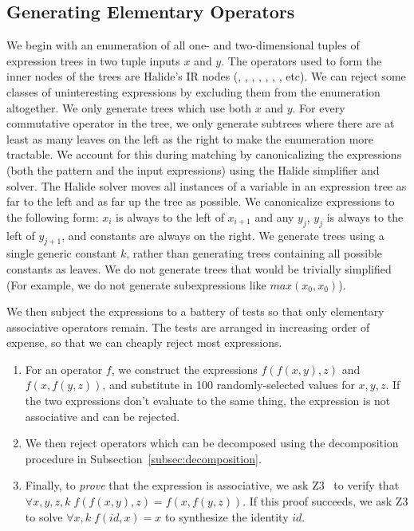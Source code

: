 \subsection{Generating Elementary Operators}
\label{subsec:generation}

We begin with an enumeration of all one- and two-dimensional tuples of expression trees in two tuple inputs $x$ and $y$. The operators used to form the inner nodes of the trees are Halide's IR nodes (\code{*}, \code{+}, \code{-}, , , , \code{<}, etc). We can reject some classes of uninteresting expressions by excluding them from the enumeration altogether. We only generate trees which use both $x$ and $y$. For every commutative operator in the tree, we only generate subtrees where there are at least as many leaves on the left as the right to make the enumeration more tractable. We account for this during matching by canonicalizing the expressions (both the pattern and the input expressions) using the Halide simplifier and solver. The Halide solver moves all instances of a variable in an expression tree as far to the left and as far up the tree as possible. We canonicalize expressions to the following form: $x_i$ is always to the left of $x_{i+1}$ and any $y_j$, $y_j$ is always to the left of $y_{j+1}$, and constants are always on the right. We generate trees using a single generic constant $k$, rather than generating trees containing all possible constants as leaves. We do not generate trees that would be trivially simplified (For example, we do not generate subexpressions like $max(x_0, x_0)$).

We then subject the expressions to a battery of tests so that only elementary associative operators remain. The tests are arranged in increasing order of expense, so that we can cheaply reject most expressions.

\begin{enumerate}
\item For an operator $f$, we construct the expressions $f(f(x, y), z)$ and $f(x, f(y, z))$, and substitute in 100 randomly-selected values for $x, y, z$. If the two expressions don't evaluate to the same thing, the expression is not associative and can be rejected.
\item We then reject operators which can be decomposed using the decomposition procedure in Subsection~\ref{subsec:decomposition}.
\item Finally, to \emph{prove} that the expression is associative, we ask Z3~\cite{DeMoura:2008:ZES:1792734.1792766} to verify that $\forall x, y, z, k \;f(f(x, y), z) = f(x, f(y, z))$. If this proof succeeds, we ask Z3 to solve $\forall x, k \;f(id, x) = x$ to synthesize the identity $id$.
\end{enumerate}

